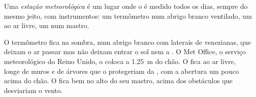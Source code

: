\begin{definition}\label{def:g4:clouds-rain-snow:weather-station}
Uma \emph{estação meteorológica} é um lugar onde o 
é medido todos os dias, sempre do mesmo jeito, com instrumentos: um
termômetro num abrigo branco ventilado, um  ao ar livre, um
 num mastro.
\end{definition}

O termômetro fica na sombra, num abrigo branco com laterais de venezianas,
que deixam o ar passar mas não deixam entrar o sol nem a . O Met
Office, o serviço meteorológico do Reino Unido, o coloca a
\SI{1.25}{\metre} do chão. O  fica ao ar livre, longe de muros
e de árvores que o protegeriam da , com a abertura um pouco acima do
chão. O  fica bem no alto do seu mastro, acima dos obstáculos
que desviariam o vento.

